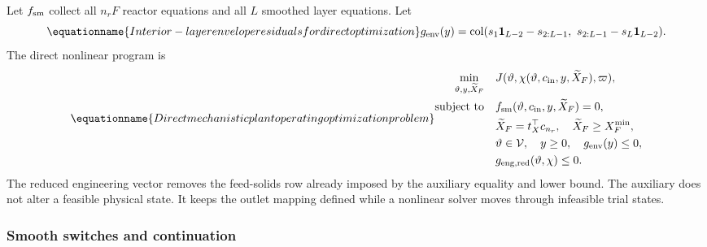 Let $f_{\rm sm}$ collect all $n_rF$ reactor equations and all $L$ smoothed layer equations. Let
\begin{equation}
\equationname{Interior-layer envelope residuals for direct optimization}
g_{\rm env}(y)=\operatorname{col}
(s_1\mathbf1_{L-2}-s_{2:L-1},\ s_{2:L-1}-s_L\mathbf1_{L-2}).
\end{equation}
The direct nonlinear program is
\begin{equation}
\equationname{Direct mechanistic plant operating optimization problem}
\begin{aligned}
\min_{\vartheta,y,\widetilde X_F}\quad&J(\vartheta,\chi(\vartheta,c_{\rm in},y,\widetilde X_F),\varpi),\\
\text{subject to}\quad&f_{\rm sm}(\vartheta,c_{\rm in},y,\widetilde X_F)=0,\\
&\widetilde X_F=t_X^\top c_{n_r},\quad\widetilde X_F\ge X_F^{\min},\\
&\vartheta\in\mathcal V,\quad y\ge0,\quad g_{\rm env}(y)\le0,\\
&g_{{\rm eng},\rm red}(\vartheta,\chi)\le0.
\end{aligned}
\label{eq:plant_direct_optimization}
\end{equation}
The reduced engineering vector removes the feed-solids row already imposed by the auxiliary equality and lower bound. The auxiliary does not alter a feasible physical state. It keeps the outlet mapping defined while a nonlinear solver moves through infeasible trial states.

\subsubsection{Smooth switches and continuation}

